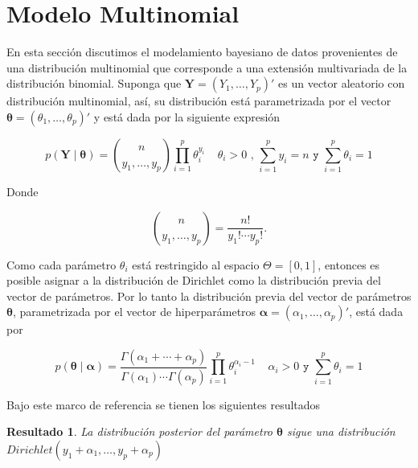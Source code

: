 \documentclass[
  10pt,
  spanish,
]{book}
\newtheorem{proposition}{Resultado}[chapter]
\theoremstyle{definition}
\theoremstyle{definition}
\theoremstyle{definition}
\theoremstyle{definition}
\theoremstyle{remark}
\begin{document}
\hypertarget{modelo-multinomial}{%
\section{Modelo Multinomial}\label{modelo-multinomial}}

En esta sección discutimos el modelamiento bayesiano de datos provenientes de una distribución multinomial que corresponde a una extensión multivariada de la distribución binomial. Suponga que \(\textbf{Y}=(Y_1,\ldots,Y_p)'\) es un vector aleatorio con distribución multinomial, así, su distribución está parametrizada por el vector \(\boldsymbol \theta=(\theta_1,\ldots,\theta_p)'\) y está dada por la siguiente expresión

\begin{equation}
p(\mathbf{Y} \mid \boldsymbol \theta)=\binom{n}{y_1,\ldots,y_p}\prod_{i=1}^p\theta_i^{y_i} \ \ \ \ \ \theta_i>0 \texttt{ , }  \sum_{i=1}^py_i=n \texttt{ y } \sum_{i=1}^p\theta_i=1
\end{equation}

Donde

\begin{equation*}
\binom{n}{y_1,\ldots,y_p}=\frac{n!}{y_1!\cdots y_p!}.
\end{equation*}

Como cada parámetro \(\theta_i\) está restringido al espacio \(\Theta=[0,1]\), entonces es posible asignar a la distribución de Dirichlet como la distribución previa del vector de parámetros. Por lo tanto la distribución previa del vector de parámetros \(\boldsymbol \theta\), parametrizada por el vector de hiperparámetros \(\boldsymbol \alpha=(\alpha_1,\ldots,\alpha_p)'\), está dada por

\begin{equation}
p(\boldsymbol \theta\mid \boldsymbol \alpha)=\frac{\Gamma(\alpha_1+\cdots+\alpha_p)}{\Gamma(\alpha_1)\cdots\Gamma(\alpha_p)}
  \prod_{i=1}^p\theta_i^{\alpha_i-1} \ \ \ \ \ \alpha_i>0 \texttt{ y } \sum_{i=1}^p\theta_i=1
\end{equation}

Bajo este marco de referencia se tienen los siguientes resultados

\begin{proposition}
\protect\hypertarget{prp:unnamed-chunk-64}{}{\label{prp:unnamed-chunk-64} }La distribución posterior del parámetro \(\boldsymbol \theta\) sigue una distribución \(Dirichlet(y_1+\alpha_1,\ldots,y_p+\alpha_p)\)
\end{proposition}
\end{document}
